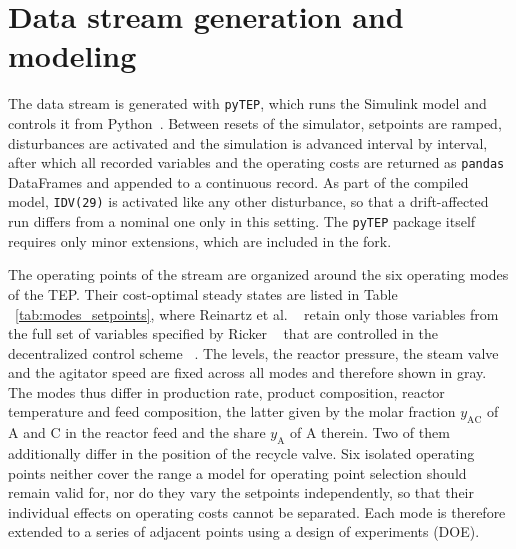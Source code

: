 \section{Data stream generation and modeling} \label{sec:generation_modelling}
%
The data stream is generated with \texttt{pyTEP}, which runs the Simulink model and controls it from Python~\cite{reinartz.2022}. Between resets of the simulator, setpoints are ramped, disturbances are activated and the simulation is advanced interval by interval, after which all recorded variables and the operating costs are returned as \texttt{pandas} DataFrames and appended to a continuous record. As part of the compiled model, \texttt{IDV(29)} is activated like any other disturbance, so that a drift-affected run differs from a nominal one only in this setting. The \texttt{pyTEP} package itself requires only minor extensions, which are included in the fork. \par
%
The operating points of the stream are organized around the six operating modes of the TEP. Their cost-optimal steady states are listed in Table ~\ref{tab:modes_setpoints}, where Reinartz et al. ~\cite{reinartz.2021} retain only those variables from the full set of variables specified by Ricker ~\cite{ricker.1995} that are controlled in the decentralized control scheme ~\cite{ricker.1996}.
The levels, the reactor pressure, the steam valve and the agitator speed are fixed across all modes and therefore shown in gray. The modes thus differ in production rate, product composition, reactor temperature and feed composition, the latter given by the molar fraction $y_\mathrm{AC}$ of A and C in the reactor feed and the share $y_\mathrm{A}$ of A therein. Two of them additionally differ in the position of the recycle valve. Six isolated operating points neither cover the range a model for operating point selection should remain valid for, nor do they vary the setpoints independently, so that their individual effects on operating costs cannot be separated. Each mode is therefore extended to a series of adjacent points using a design of experiments (DOE).\par
%
